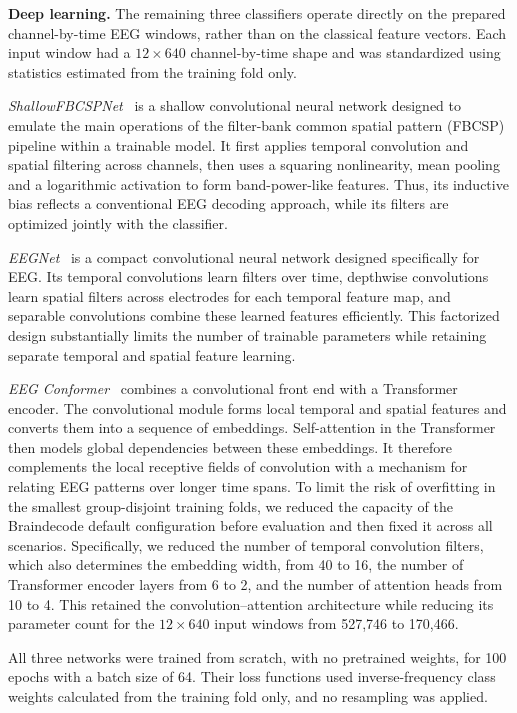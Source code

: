 \documentclass[10pt,letterpaper]{article}
\newcommand{\rev}[1]{#1}
\begin{document}
\textbf{Deep learning.}
\rev{The remaining three classifiers operate directly on the prepared
channel-by-time EEG windows, rather than on the classical feature vectors. Each
input window had a $12 \times 640$ channel-by-time shape and was standardized
using statistics estimated from the training fold only.}

\rev{\textit{ShallowFBCSPNet}~\cite{schirrmeister2017deep} is a shallow
convolutional neural network designed to emulate the main operations of the
filter-bank common spatial pattern (FBCSP) pipeline within a trainable model.
It first applies temporal convolution and spatial filtering across channels,
then uses a squaring nonlinearity, mean pooling and a logarithmic activation to
form band-power-like features. Thus, its inductive bias reflects a conventional
EEG decoding approach, while its filters are optimized jointly with the
classifier.}

\rev{\textit{EEGNet}~\cite{lawhern2018eegnet} is a compact convolutional neural
network designed specifically for EEG. Its temporal convolutions learn filters
over time, depthwise convolutions learn spatial filters across electrodes for
each temporal feature map, and separable convolutions combine these learned
features efficiently. This factorized design substantially limits the number
of trainable parameters while retaining separate temporal and spatial feature
learning.}

\rev{\textit{EEG Conformer}~\cite{song2023conformer} combines a convolutional
front end with a Transformer encoder. The convolutional module forms local
temporal and spatial features and converts them into a sequence of embeddings.
Self-attention in the Transformer then models global dependencies between these
embeddings. It therefore complements the local receptive fields of convolution
with a mechanism for relating EEG patterns over longer time spans. To limit the
risk of overfitting in the smallest group-disjoint training folds, we reduced
the capacity of the Braindecode default configuration before evaluation and
then fixed it across all scenarios. Specifically, we reduced the number of
temporal convolution filters, which also determines the embedding width, from
40 to 16, the number of Transformer encoder layers from 6 to 2, and the number
of attention heads from 10 to 4. This retained the convolution--attention
architecture while reducing its parameter count for the $12 \times 640$ input
windows from 527,746 to 170,466.}

\rev{All three networks were trained from scratch, with no pretrained weights,
for 100 epochs with a batch size of 64. Their loss functions used
inverse-frequency class weights calculated from the training fold only, and no
resampling was applied.}
\end{document}

